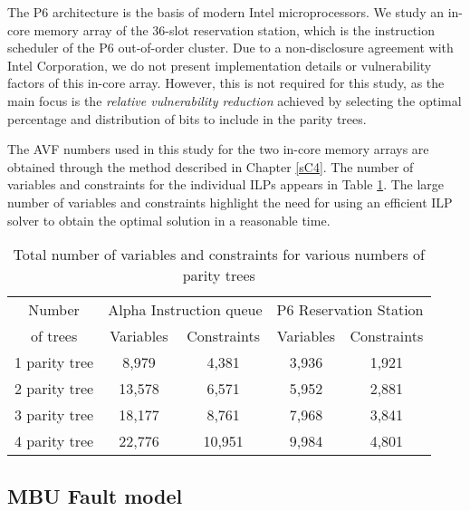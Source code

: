 \documentclass[12pt]{yalephd}
\begin{document}
The P6 architecture is the basis of modern Intel microprocessors. We study an in-core memory array of the 36-slot reservation station, which is the instruction scheduler of the P6 out-of-order cluster. Due to a non-disclosure agreement with Intel Corporation, we do not present implementation details or vulnerability factors of this in-core array. However, this is not required for this study, as the main focus is the {\it relative vulnerability reduction} achieved by selecting the optimal percentage and distribution of bits to include in the parity trees.

The AVF numbers used in this study for the two in-core memory arrays are obtained through the method described in Chapter \ref{sC4}. The number of variables and constraints for the individual ILPs appears in Table \ref{sC5tBufStats}. The large number of variables and constraints highlight the need for using an efficient ILP solver to obtain the optimal solution in a reasonable time.

\begin{table}[!ht]
\begin{center}
\caption{Total number of variables and constraints for various numbers of parity trees}
\label{sC5tBufStats}
\begin{tabular}{||c|c|c|c|c||}
\hline
\hline
Number & \multicolumn{2}{c|}{Alpha Instruction queue} & \multicolumn{2}{c||}{P6 Reservation Station} \\
of trees & Variables & Constraints & Variables & Constraints \\
\hline
\hline
1 parity tree &  8,979  & 4,381 & 3,936  & 1,921 \\
\hline
2 parity tree & 13,578  & 6,571 & 5,952  & 2,881 \\
\hline
3 parity tree & 18,177  & 8,761 & 7,968  & 3,841 \\
\hline
4 parity tree & 22,776 & 10,951 & 9,984  & 4,801 \\
\hline
\hline
\end{tabular}
\end{center}
\end{table}

\subsection{MBU Fault model}\label{sC5sMBUmodel}
\end{document}
